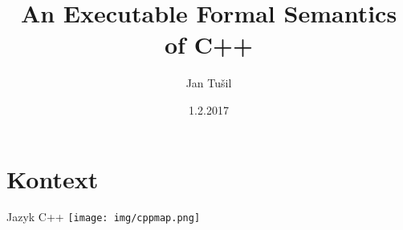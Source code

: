 \documentclass[11pt]{beamer}
\author{Jan Tušil}
\title{An Executable Formal Semantics of C++}
\institute{FI MU}
\date{1.2.2017}
\begin{document}







\begin{frame}
\titlepage
\end{frame}

\begin{frame}
\tableofcontents
\end{frame}



\section{Kontext}

\begin{frame}{Jazyk C++}
\pause
\texttt{[image: img/cppmap.png]}
\end{frame}
\end{document}

